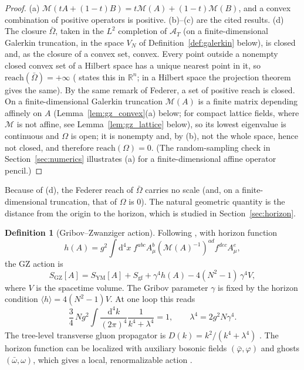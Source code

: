 \documentclass[11pt,a4paper]{amsart}
\theoremstyle{definition}
\newtheorem{definition}[theorem]{Definition}
\newcommand{\R}{\mathbb{R}}
\newcommand{\cA}{\mathcal{A}}
\newcommand{\diff}{\mathrm{d}}
\newcommand{\reach}{\mathrm{reach}}
\begin{document}
\begin{proof}
(a) $\mathcal{M}(tA + (1-t)B) = t\mathcal{M}(A) + (1-t)\mathcal{M}(B)$, and a convex combination of positive operators is positive. (b)--(c) are the cited results. (d) The closure $\bar{\Omega}$, taken in the $L^2$ completion of $\cA_T$ (on a finite-dimensional Galerkin truncation, in the space $V_N$ of Definition~\ref{def:galerkin} below), is closed and, as the closure of a convex set, convex. Every point outside a nonempty closed convex set of a Hilbert space has a unique nearest point in it, so $\reach(\bar{\Omega}) = +\infty$ (\cite[Remark~4.2]{federer1959curvature} states this in $\R^n$; in a Hilbert space the projection theorem gives the same). By the same remark of Federer, a set of positive reach is closed. On a finite-dimensional Galerkin truncation $\mathcal{M}(A)$ is a finite matrix depending affinely on $A$ (Lemma~\ref{lem:gz_convex}(a) below; for compact lattice fields, where $\mathcal{M}$ is not affine, see Lemma~\ref{lem:gz_lattice} below), so its lowest eigenvalue is continuous and $\Omega$ is open; it is nonempty and, by (b), not the whole space, hence not closed, and therefore $\reach(\Omega) = 0$. (The random-sampling check in Section~\ref{sec:numerics} illustrates (a) for a finite-dimensional affine operator pencil.)
\end{proof}

Because of (d), the Federer reach of $\bar{\Omega}$ carries no scale (and, on a finite-dimensional truncation, that of $\Omega$ is $0$). The natural geometric quantity is the distance from the origin to the horizon, which is studied in Section~\ref{sec:horizon}.

\begin{definition}[Gribov--Zwanziger action]
\label{def:gz}
Following \cite{zwanziger1989local, vandersickel2012gribov}, with horizon function
\begin{equation}
    h(A) = g^2 \int \diff^4x \; f^{abc} A^b_\mu \left(\mathcal{M}(A)^{-1}\right)^{ad} f^{dec} A^e_\mu ,
\end{equation}
the GZ action is
\begin{equation}
    S_{\mathrm{GZ}}[A] = S_{\mathrm{YM}}[A] + S_{\mathrm{gf}} + \gamma^4 h(A) - 4(N^2-1)\,\gamma^4 V,
\end{equation}
where $V$ is the spacetime volume. The Gribov parameter $\gamma$ is fixed by the horizon condition $\langle h \rangle = 4(N^2-1)V$. At one loop this reads
\begin{equation}
    \label{eq:gap}
    \frac{3}{4}\, N g^2 \int \frac{\diff^4k}{(2\pi)^4} \frac{1}{k^4 + \lambda^4} = 1, \qquad \lambda^4 = 2g^2N\gamma^4 .
\end{equation}
The tree-level transverse gluon propagator is $D(k) = k^2/(k^4 + \lambda^4)$ \cite{gribov1978quantization}. The horizon function can be localized with auxiliary bosonic fields $(\bar\varphi,\varphi)$ and ghosts $(\bar\omega,\omega)$, which gives a local, renormalizable action \cite{zwanziger1989local, zwanziger1993renormalizability}.
\end{definition}
\end{document}
